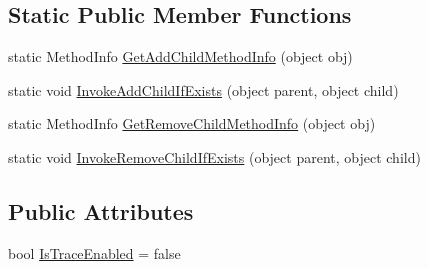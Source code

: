 \subsection*{Static Public Member Functions}
\begin{DoxyCompactItemize}
\item 
static Method\+Info \hyperlink{classi_c_s___visual_script_imp_a1ab67eb801314f50afe7b4b5569c36cf}{Get\+Add\+Child\+Method\+Info} (object obj)
\item 
static void \hyperlink{classi_c_s___visual_script_imp_a4f8ccb72a71eb329f1d9eb359cd59fd6}{Invoke\+Add\+Child\+If\+Exists} (object parent, object child)
\item 
static Method\+Info \hyperlink{classi_c_s___visual_script_imp_a853d44751d663ce10ba543c36b53b1e4}{Get\+Remove\+Child\+Method\+Info} (object obj)
\item 
static void \hyperlink{classi_c_s___visual_script_imp_a7276a7c44ccb1d0e6330870536a0cabd}{Invoke\+Remove\+Child\+If\+Exists} (object parent, object child)
\end{DoxyCompactItemize}
\subsection*{Public Attributes}
\begin{DoxyCompactItemize}
\item 
bool \hyperlink{classi_c_s___visual_script_imp_aa551e34c732efb894127f2488f366a9b}{Is\+Trace\+Enabled} = false
\end{DoxyCompactItemize}

